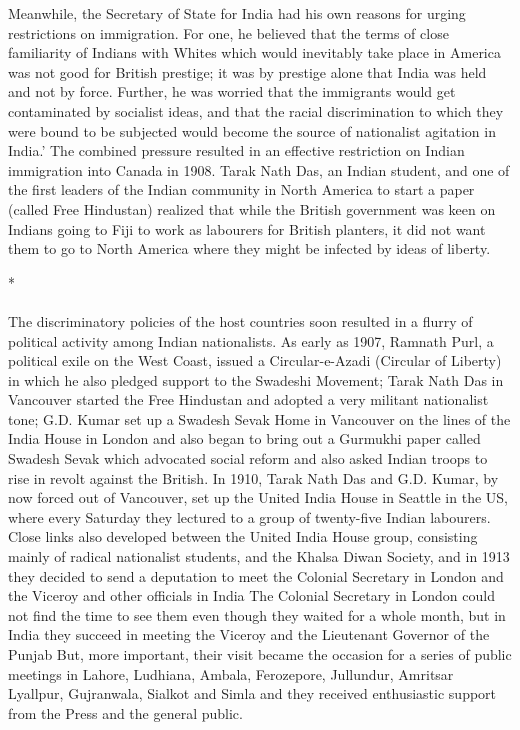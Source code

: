 Meanwhile, the Secretary of State for India had his own reasons for urging restrictions on immigration. For one, he believed that the terms of close familiarity of Indians with Whites which would inevitably take place in America was not good for British prestige; it was by prestige alone that India was held and not by force. Further, he was worried that the immigrants would get contaminated by socialist ideas, and that the racial discrimination to which they were bound to be subjected would become the source of nationalist agitation in India.' The combined pressure resulted in an effective restriction on Indian immigration into Canada in 1908. Tarak Nath Das, an Indian student, and one of the first leaders of the Indian community in North America to start a paper (called Free Hindustan) realized that while the British government was keen on Indians going to Fiji to work as labourers for British planters, it did not want them to go to North America where they might be infected by ideas of liberty.

\begin{center}*\end{center}

\paragraph*{}

The discriminatory policies of the host countries soon resulted in a flurry of political activity among Indian nationalists. As early as 1907, Ramnath Purl, a political exile on the West Coast, issued a Circular-e-Azadi (Circular of Liberty) in which he also pledged support to the Swadeshi Movement; Tarak Nath Das in Vancouver started the Free Hindustan and adopted a very militant nationalist tone; G.D. Kumar set up a Swadesh Sevak Home in Vancouver on the lines of the India House in London and also began to bring out a Gurmukhi paper called Swadesh Sevak which advocated social reform and also asked Indian troops to rise in revolt against the British. In 1910, Tarak Nath Das and G.D. Kumar, by now forced out of Vancouver, set up the United India House in Seattle in the US, where every Saturday they lectured to a group of twenty-five Indian labourers. Close links also developed between the United India House group, consisting mainly of radical nationalist students, and the Khalsa Diwan Society, and in 1913 they decided to send a deputation to meet the Colonial Secretary in London and the Viceroy and other officials in India The Colonial Secretary in London could not find the time to see them even though they waited for a whole month, but in India they succeed in meeting the Viceroy and the Lieutenant Governor of the Punjab But, more important, their visit became the occasion for a series of public meetings in Lahore, Ludhiana, Ambala, Ferozepore, Jullundur, Amritsar Lyallpur, Gujranwala, Sialkot and Simla and they received enthusiastic support from the Press and the general public.

